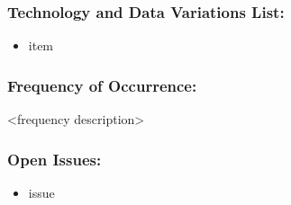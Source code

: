 \documentclass[ProductRequirements.tex]{subfiles}
\begin{document}
	\subsubsection*{Technology and Data Variations List:}
	\begin{itemize}\itemsep1pt
		\item item
	\end{itemize}
	\subsubsection*{Frequency of Occurrence:}
	<frequency description>
	\subsubsection*{Open Issues:}
	\begin{itemize}\itemsep1pt
		\item issue
	\end{itemize}		
		
\end{document}
